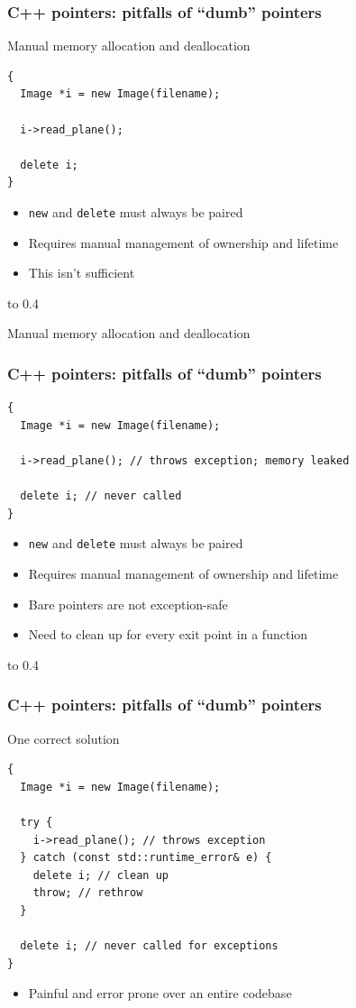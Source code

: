 \documentclass[handout]{beamer}
\begin{document}
\begin{frame}[fragile]
  \frametitle{C++ pointers: pitfalls of “dumb” pointers}
\begin{block}{Manual memory allocation and deallocation}
  \begin{lstlisting}
{
  Image *i = new Image(filename);

  i->read_plane();

  delete i;
}
\end{lstlisting}
  \begin{itemize}
  \item \texttt{new} and \texttt{delete} must always be paired
  \item Requires manual management of ownership and lifetime
    \pause
  \item This isn't sufficient
  \end{itemize}
\end{block}
\vbox to 0.4\textheight{%
}%
\end{frame}

\begin{frame}[fragile]
\begin{block}{Manual memory allocation and deallocation}
  \frametitle{C++ pointers: pitfalls of “dumb” pointers}
  \begin{lstlisting}
{
  Image *i = new Image(filename);

  i->read_plane(); // throws exception; memory leaked

  delete i; // never called
}
\end{lstlisting}
  \begin{itemize}
  \item \texttt{new} and \texttt{delete} must always be paired
  \item Requires manual management of ownership and lifetime
  \item Bare pointers are not exception-safe
    \pause
  \item Need to clean up for every exit point in a function
  \end{itemize}
\end{block}
\vbox to 0.4\textheight{%
}%
\end{frame}

\begin{frame}[fragile]
  \frametitle{C++ pointers: pitfalls of “dumb” pointers}
  \begin{block}{One correct solution}
  \begin{lstlisting}
{
  Image *i = new Image(filename);

  try {
    i->read_plane(); // throws exception
  } catch (const std::runtime_error& e) {
    delete i; // clean up
    throw; // rethrow
  }

  delete i; // never called for exceptions
}
\end{lstlisting}
  \begin{itemize}
    \pause
  \item Painful and error prone over an entire codebase
  \end{itemize}
  \end{block}
\end{frame}
\end{document}
